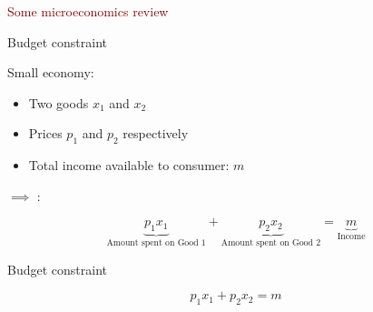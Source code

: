\begin{frame}{}

    \begin{center}
        \Large \textcolor{maroon}{Some microeconomics review}
        \end{center}
\end{frame}
\begin{frame}{Budget constraint}

    Small economy:
    \begin{itemize}
        \item Two goods $x_1$ and $x_2$
        \item Prices $p_1$ and $p_2$ respectively
        \item Total income available to consumer: $m$
    \end{itemize} 
    \vspace{3mm}

    $\implies$ :

    \begin{equation*}
        \underbrace{p_{1} x_{1}}_{\text{Amount spent on Good 1}}
        +
        \underbrace{p_{2} x_{2}}_{\text{Amount spent on Good 2}}
        = \underbrace{m}_{\text{Income}}
    \end{equation*}


\end{frame}
\begin{frame}{Budget constraint}

    \begin{minipage}[c]{0.55\textwidth}
        \hspace{7mm}
        \vspace{5mm}
    \end{minipage}
    \hfill
    \begin{minipage}[c]{0.40\textwidth}
        \vspace{-45mm}
        \begin{equation*}
            p_{1} x_{1}
            +
            p_{2} x_{2}
            = m
        \end{equation*}
    \end{minipage}
 
 \end{frame}
